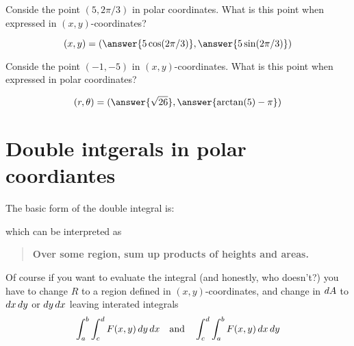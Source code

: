 \documentclass{ximera}
\begin{document}
\begin{question}
  Conside the point $(5, 2\pi/3)$ in polar coordinates. What is this
  point when expressed in $(x,y)$-coordinates?
  \begin{prompt}
    \[
    (x,y) = (\answer{5\cos(2\pi/3)}, \answer{5 \sin(2\pi/3)})
    \]
  \end{prompt}
  \begin{question}
    Conside the point $(-1, -5)$ in $(x,y)$-coordinates. What is this
    point when expressed in polar coordinates?
    \begin{prompt}
      \[
      (r,\theta) = (\answer{\sqrt{26}}, \answer{\arctan(5)-\pi})
      \]
    \end{prompt}
  \end{question}
\end{question}

\section{Double intgerals in polar coordiantes}

The basic form of the double integral is:
\begin{image}
\end{image}
which can be interpreted as
\begin{quote}
  \textbf{Over \textcolor{red!50!black}{some region},
    \textcolor{green!70!black!70!blue}{sum up} products of
    \textcolor{purple!50!blue!90!black}{heights} and \textcolor{blue!70!green}{areas}.}
\end{quote}
Of course if you want to evaluate the integral (and honestly, who
doesn't?) you have to change $R$ to a region defined in $(x,y)$-coordinates,
and change in $\mathop{}\!d A$ to $\mathop{}\!d x\mathop{}\!d y$ or $\mathop{}\!d y\mathop{}\!d x$ leaving interated integrals
\[
\int_a^b\int_c^d F(x,y) \mathop{}\!d y \mathop{}\!d x\quad\text{and}\quad \int_c^d \int_a^b F(x,y) \mathop{}\!d x\mathop{}\!d y
\]
\end{document}
